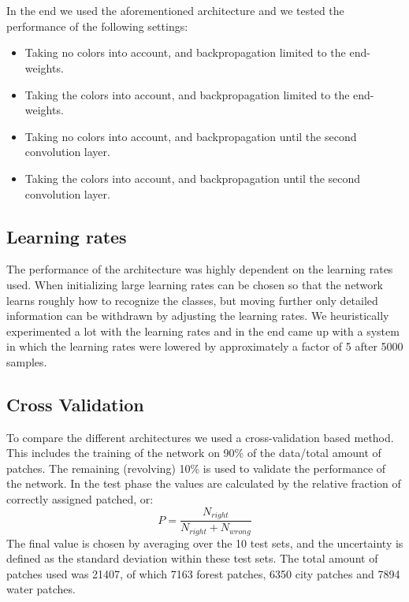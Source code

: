 \documentclass[a4paper,onecolumn]{report}
\begin{document}
\\\\
In the end we used the aforementioned architecture and we tested the performance of the following settings: 
\begin{itemize}
\item Taking no colors into account, and backpropagation limited to the end-weights.
\item Taking the colors into account, and backpropagation limited to the end-weights.
\item Taking no colors into account, and backpropagation until the second convolution layer.
\item Taking the colors into account, and backpropagation until the second convolution layer. 
\end{itemize}


\subsection{Learning rates}
The performance of the architecture was highly dependent on the learning rates used. When initializing large learning rates can be chosen so that the network learns roughly how to recognize the classes, but moving further only detailed information can be withdrawn by adjusting the learning rates. We heuristically experimented a lot with the learning rates and in the end came up with a system in which the learning rates were lowered by approximately a factor of 5 after 5000 samples. 

\subsection{Cross Validation}
To compare the different architectures we used a cross-validation based method. This includes the training of the network on 90\% of the data/total amount of patches. The remaining (revolving) 10\% is used to validate the performance of the network. In the test phase the values are calculated by the relative fraction of correctly assigned patched, or: 
\begin{equation}
\label{eq:P}
P= \frac{N_{right}}{N_{right}+ N_{wrong}}
\end{equation}
The final value is chosen by averaging over the 10 test sets, and the uncertainty is defined as the standard deviation within these test sets. The total amount of patches used was 21407, of which 7163 forest patches, 6350 city patches and 7894 water patches. 
\end{document}
